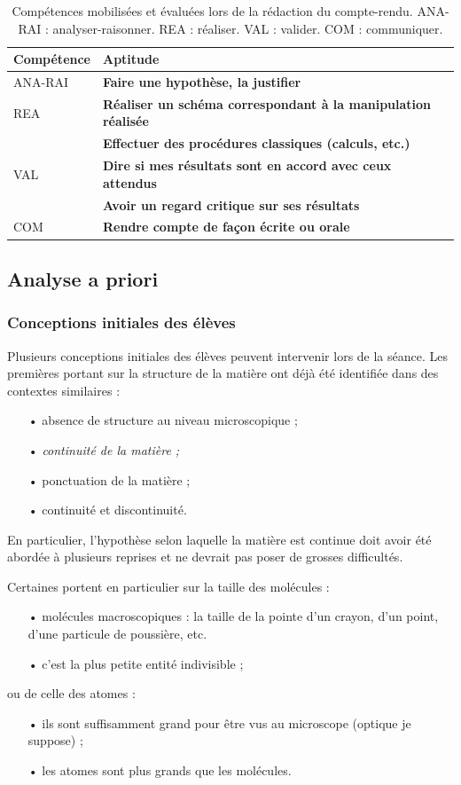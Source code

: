 \documentclass[12pt,a4paper]{article}
\newcommand{\rea}{\colorbox{yellow_c}{\textcolor{yellow_f}{REA}}}
\newcommand{\anarai}{\colorbox{green_c}{\textcolor{green_f}{ANA-RAI}}}
\newcommand{\val}{\colorbox{orange_c}{\textcolor{orange_f}{VAL}}}
\newcommand{\com}{\colorbox{red_c}{\textcolor{red_f}{COM}}}
\begin{document}
\begin{table}
\center
\begin{tabular}{l|l}
\textbf{Compétence} & \textbf{Aptitude} \\
\hline \hline
\anarai 	& \textbf{Faire une hypothèse, la justifier} \\
\hline
\rea			& \textbf{Réaliser un schéma correspondant à la manipulation réalisée} \\
				& \textbf{Effectuer des procédures classiques (calculs, etc.)} \\
\hline
\val			& \textbf{Dire si mes résultats sont en accord avec ceux attendus} \\
 				& \textbf{Avoir un regard critique sur ses résultats} \\
\hline
\com		& \textbf{Rendre compte de façon écrite ou orale}
\end{tabular}
\caption{Compétences mobilisées et évaluées lors de la rédaction du compte-rendu.
\anarai{} : analyser-raisonner.
\rea{} : réaliser.
\val{} : valider.
\com{} : communiquer.}
\label{tab:cptces_cr}
\end{table}

\subsection{Analyse a priori}

\subsubsection{Conceptions initiales des élèves}

Plusieurs conceptions initiales des élèves peuvent intervenir lors de la séance.
Les premières portant sur la structure de la matière ont déjà été identifiée dans des contextes similaires \cite{Bain1985} :
\begin{itemize}
\item[•] absence de structure au niveau microscopique ;
\item[•] \emph{continuité de la matière ;}
\item[•] ponctuation de la matière ;
\item[•] continuité et discontinuité.
\end{itemize}
En particulier, l'hypothèse selon laquelle la matière est continue doit avoir été abordée à plusieurs reprises et ne devrait pas poser de grosses difficultés.

Certaines portent en particulier sur la taille des molécules \cite{Griffiths1992} :
\begin{itemize}
\item[•] molécules \og macroscopiques \fg{} : la taille de la pointe d'un crayon, d'un point, d'une particule de poussière, etc. 
\item[•] c'est la plus petite entité indivisible ;
\end{itemize}
ou de celle des atomes :
\begin{itemize}
\item[•] ils sont suffisamment grand pour être vus au microscope (optique je suppose) ;
\item[•] les atomes sont plus grands que les molécules.
\end{itemize}
\end{document}
